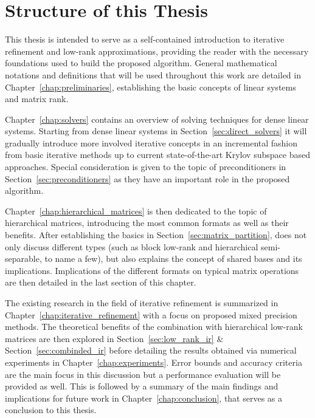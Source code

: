 \section{Structure of this Thesis}
\label{sec:structure}

This thesis is intended to serve as a self-contained introduction to iterative refinement and low-rank approximations, providing the reader with the necessary foundations used to build the proposed algorithm. General mathematical notations and definitions that will be used throughout this work are detailed in Chapter~\hyperref[chap:preliminaries]{\ref{chap:preliminaries}}, establishing the basic concepts of linear systems and matrix rank.

Chapter~\hyperref[chap:solvers]{\ref{chap:solvers}} contains an overview of solving techniques for dense linear systems. Starting from dense linear systems in Section~\hyperref[sec:direct_solvers]{\ref{sec:direct_solvers}} it will gradually introduce more involved iterative concepts in an incremental fashion from basic iterative methods up to current state-of-the-art Krylov subspace based approaches. Special consideration is given to the topic of preconditioners in Section~\hyperref[sec:preconditioners]{\ref{sec:preconditioners}} as they have an important role in the proposed algorithm.

Chapter~\hyperref[chap:hierarchical_matrices]{\ref{chap:hierarchical_matrices}} is then dedicated to the topic of hierarchical matrices, introducing the most common formats as well as their benefits. After establishing the basics in Section~\hyperref[sec:matrix_partition]{\ref{sec:matrix_partition}}, does not only discuss different types (such as block low-rank and hierarchical semi-separable, to name a few), but also explains the concept of shared bases and its implications. Implications of the different formats on typical matrix operations are then detailed in the last section of this chapter. 

The existing research in the field of iterative refinement is summarized in Chapter~\hyperref[chap:iterative_refinement]{\ref{chap:iterative_refinement}} with a focus on proposed mixed precision methods. The theoretical benefits of the combination with hierarchical low-rank matrices are then explored in Section~\hyperref[sec:sec:low_rank_ir]{\ref{sec:low_rank_ir}} \& Section~\hyperref[sec:combinded_ir]{\ref{sec:combinded_ir}} before detailing the results obtained via numerical experiments in Chapter~\hyperref[chap:experiments]{\ref{chap:experiments}}. Error bounds and accuracy criteria are the main focus in this discussion but a performance evaluation will be provided as well. This is followed by a summary of the main findings and implications for future work in Chapter~\hyperref[chap:conclusion]{\ref{chap:conclusion}}, that serves as a conclusion to this thesis.